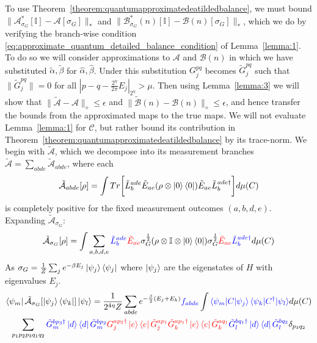 \documentclass[aps,floatfix,10pt,amssymb,amsfont,amsmath,superscriptaddress,float,nofootinbib,longbibliography,nobalancelastpage,twocolumn]{revtex4-2}
\begin{document}
\begin{widetext}
To use Theorem~\ref{theorem:quantumapproximatedeatildedbalance}, we must bound $\|\mathcal{A}^*_{\sigma_G}[\mathbb{I}]-\mathcal{A}[\sigma_G]\|_*$ and $\|\mathcal{B}^*_{\sigma_G}(n)[\mathbb{I}]-\mathcal{B}(n)[\sigma_G]\|_*$, which we do by verifying the branch-wise condition \eqref{eq:approximate_quantum_detailed_balance_condition} of Lemma~\ref{lemma:1}. To do so we will consider approximations to $\mathcal{A}$ and $\mathcal{B}(n)$ in which we have substituted $\tilde \alpha, \tilde \beta$ for $\hat \alpha, \hat \beta$. Under this substitution $G^{pq}_j$ becomes $\tilde G^{pq}_j$ such that $\|\tilde G^{pq}_j\| =0$ for all $|p-q-\frac{2^{\eta}}{2\pi}E_j|_{2^{\eta}} > \mu$. Then using Lemma~\ref{lemma:3} we will show that $\|\tilde{\mathcal{A}}-\mathcal{A}\|_{\diamond} \leq \epsilon$ and $\|\tilde{\mathcal{B}}(n)-\mathcal{B}(n)\|_{\diamond} \leq \epsilon$, and hence transfer the bounds from the approximated maps to the true maps. We will not evaluate Lemma~\ref{lemma:1} for $\mathcal{C}$, but rather bound its contribution in Theorem~\ref{theorem:quantumapproximatedeatildedbalance} by its trace-norm. We begin with $\tilde{\mathcal{A}}$, which we decompose into its measurement branches $\tilde{\mathcal{A}} = \sum_{abde}\tilde{\mathcal{A}}_{abde}$, where each
\begin{equation}
    \tilde{\mathcal{A}}_{abde}[\rho] = \int  Tr\bigg[\tilde L_b^{ade} \tilde E_{ae} ( \rho\otimes \ket{0}\bra{0})
     \tilde E_{ae}\tilde L^{ade\dagger}_b\bigg]d\mu(C)
\end{equation}
is completely positive for the fixed measurement outcomes $(a,b,d,e)$. Expanding $\tilde{\mathcal{A}}_{\sigma_G}$:
    \begin{equation}
    \tilde{\mathcal{A}}_{\sigma_G}[\rho] = \int \sum_{a,b,d,e}\textcolor{blue}{\tilde L^{ade}_b} \textcolor{red}{\tilde E_{ae}} \sigma_G^{\frac{1}{2}} (\rho\otimes \mathbb{I}\otimes \ket{0}\bra{0}) \sigma_G^{\frac{1}{2}}\textcolor{red}{\tilde E_{ae}}\textcolor{blue}{\tilde L^{ade\dagger}_b} d\mu(C)
\end{equation}
As $\sigma_G = \frac{1}{Z}\sum_j e^{-\beta E_j} \ket{\psi_j}\bra{\psi_j}$ where $\ket{\psi_j}$ are the eigenstates of $H$ with eigenvalues $E_j$. 
\begin{multline}
    \bra{\psi_m}\tilde{\mathcal{A}}_{\sigma_G}[\ket{\psi_j}\bra{\psi_k}]\ket{\psi_l}=\frac{1}{2^{4\eta}Z} \sum_{abde} e^{-\frac{\beta}{2}(E_j+E_k)}\textcolor{blue}{f_{abde}} \int \textcolor{blue}{\braket{\psi_m|C|\psi_j}\braket{\psi_k|C^{\dagger}|\psi_l}} d\mu(C)\\\sum_{p_1p_2p_3q_1 q_2} \textcolor{blue}{\tilde G^{bp_3\dagger}_m\ket{d}\bra{d}\tilde G^{bp_2}_m} \textcolor{red}{G_j^{ap_2\dagger}\ket{e}\bra{e}\tilde G_j^{ap_1}\tilde G_k^{ap_1\dagger}\ket{e}\bra{e}\tilde G_k^{aq_1}} \textcolor{blue}{\tilde G^{bq_1\dagger}_l\ket{d}\bra{d}\tilde G^{bq_2}_l} \delta_{p_3q_2}

\end{multline}
\end{widetext}
\end{document}

